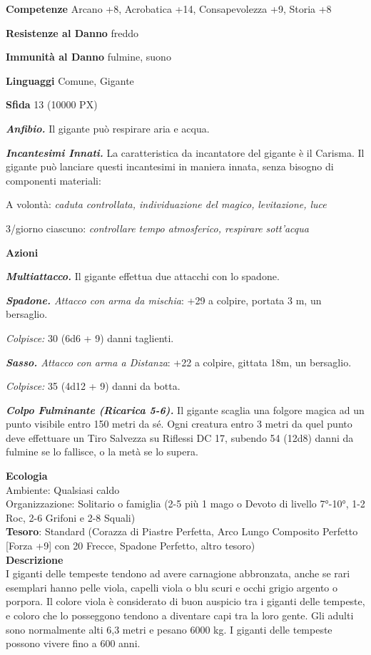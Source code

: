 \begin{multicols}{2}
	\textbf{Competenze} Arcano +8, Acrobatica +14, Consapevolezza +9, Storia +8

	\textbf{Resistenze al Danno} freddo

	\textbf{Immunità al Danno} fulmine, suono

	\textbf{Linguaggi} Comune, Gigante

	\textbf{Sfida} 13 (10000 PX)

	\textit{\textbf{Anfibio.}} Il gigante può respirare aria e acqua.

	\textit{\textbf{Incantesimi Innati.}} La caratteristica da incantatore del gigante è il Carisma. Il gigante può lanciare questi incantesimi in maniera innata, senza bisogno di componenti materiali:

	A volontà: \textit{caduta controllata, individuazione del magico,} \textit{levitazione, luce}

	3/giorno ciascuno: \textit{controllare tempo atmosferico, respirare} \textit{sott'acqua}

	\textbf{Azioni}

	\textit{\textbf{Multiattacco.}} Il gigante effettua due attacchi con lo spadone.

	\textit{\textbf{Spadone.} Attacco con arma da mischia}: +29 a colpire, portata 3 m, un bersaglio.

	\textit{Colpisce:} 30 (6d6 + 9) danni taglienti.

	\textit{\textbf{Sasso.} Attacco con arma a Distanza}: +22 a colpire, gittata 18m, un bersaglio.

	\textit{Colpisce:} 35 (4d12 + 9) danni da botta.

	\textit{\textbf{Colpo Fulminante (Ricarica 5-6).}} Il gigante scaglia una folgore magica ad un punto visibile entro 150 metri da sé. Ogni creatura entro 3 metri da quel punto deve effettuare un Tiro Salvezza su Riflessi DC 17, subendo 54 (12d8) danni da fulmine se lo fallisce, o la metà se lo supera.

	\textbf{Ecologia}\\
	Ambiente: Qualsiasi caldo\\
	Organizzazione: Solitario o famiglia (2-5 più 1 mago o Devoto di livello 7°-10°, 1-2 Roc, 2-6 Grifoni e 2-8 Squali)\\
	\textbf{Tesoro}: Standard (Corazza di Piastre Perfetta, Arco Lungo Composito Perfetto [Forza +9] con 20 Frecce, Spadone Perfetto, altro tesoro)\\
	\textbf{Descrizione}\\
	I giganti delle tempeste tendono ad avere carnagione abbronzata, anche se rari esemplari hanno pelle viola, capelli viola o blu scuri e occhi grigio argento o porpora. Il colore viola è considerato di buon auspicio tra i giganti delle tempeste, e coloro che lo posseggono tendono a diventare capi tra la loro gente. Gli adulti sono normalmente alti 6,3 metri e pesano 6000 kg. I giganti delle tempeste possono vivere fino a 600 anni.


\end{multicols}
